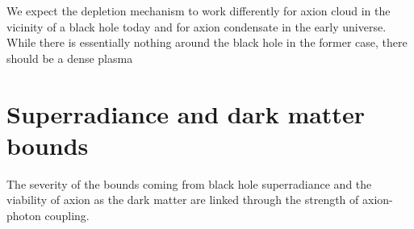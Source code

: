 \documentclass[%
 reprint,
 amsmath,amssymb,
 aps,nofootinbib
]{revtex4-1}
\begin{document}
We expect the depletion mechanism to work differently for axion cloud in the vicinity of a black hole today and for axion condensate in the early universe. While there is essentially nothing around the black hole in the former case, there should be a dense plasma 








\section{Superradiance and dark matter bounds}
The severity of the bounds coming from black hole superradiance and the viability of axion as the dark matter are linked through the strength of axion-photon coupling.










\newpage


% 
\end{document}
